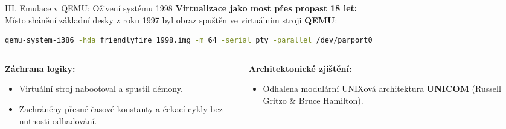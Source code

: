 \documentclass[aspectratio=169,11pt]{beamer}
\begin{document}
\begin{frame}[fragile]{III. Emulace v QEMU: Oživení systému 1998}
  \textbf{Virtualizace jako most přes propast 18 let:}\\
  Místo shánění základní desky z roku 1997 byl obraz spuštěn ve virtuálním stroji \textbf{QEMU}:
  \vspace{0.2cm}
\begin{lstlisting}[language=bash]
qemu-system-i386 -hda friendlyfire_1998.img -m 64 -serial pty -parallel /dev/parport0
\end{lstlisting}
  \vspace{0.3cm}
  \begin{columns}
    \begin{column}{0.48\textwidth}
      \textbf{Záchrana logiky:}
      \begin{itemize}
        \item Virtuální stroj nabootoval a spustil démony.
        \item Zachráněny přesné časové konstanty a čekací cykly bez nutnosti odhadování.
      \end{itemize}
    \end{column}
    \begin{column}{0.48\textwidth}
      \textbf{Architektonické zjištění:}
      \begin{itemize}
        \item Odhalena modulární UNIXová architektura \textbf{UNICOM} (Russell Gritzo \& Bruce Hamilton).
      \end{itemize}
    \end{column}
  \end{columns}
\end{frame}
\end{document}
